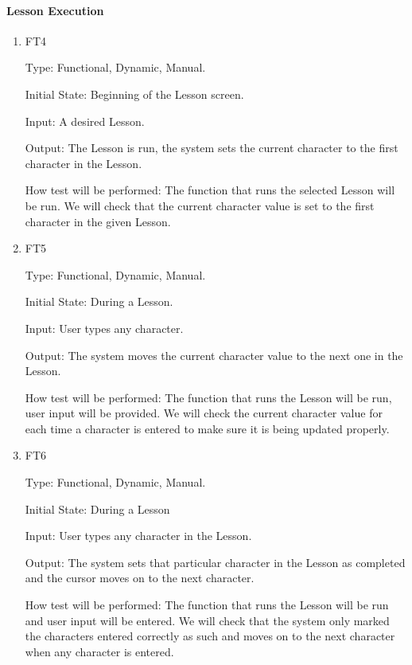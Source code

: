 \documentclass[12pt, titlepage]{article}
\begin{document}
\paragraph{Lesson Execution}
\begin{enumerate}
    					
\item{{\color{cyan}FT4}\\}

Type: Functional, Dynamic, Manual.
					
Initial State: Beginning of the Lesson screen.
					
Input: A desired Lesson.
					
Output: The Lesson is run, the system sets the current character to the first character in the Lesson.
					
How test will be performed: The function that runs the selected Lesson will be run. We will check that the current character value is set to the first character in the given Lesson.

					
\item{{\color{cyan}FT5}\\}

Type: Functional, Dynamic, Manual.
					
Initial State: During a Lesson.
					
Input: User types any character.
					
Output: The system moves the current character value to the next one in the Lesson.
					
How test will be performed: The function that runs the Lesson will be run, user input will be provided. We will check the current character value for each time a character is entered to make sure it is being updated properly.

					
\item{{\color{cyan}FT6}\\}

Type: Functional, Dynamic, Manual.
					
Initial State: During a Lesson
					
Input: User types any character in the Lesson.
					
Output: The system sets that particular character in the Lesson as completed and the cursor moves on to the next character.
					
How test will be performed: The function that runs the Lesson will be run and user input will be entered. We will check that the system only marked the characters entered correctly as such and moves on to the next character when any character is entered.


\end{enumerate}
\end{document}
